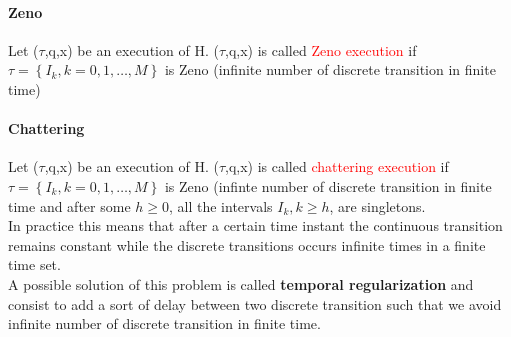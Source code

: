 \paragraph{Zeno} Let ($\tau$,q,x) be an execution of H. ($\tau$,q,x)  is called \textcolor{red}{Zeno execution} if $\tau = \left\{I_k, k=0,1,\dots,M\right\}$ is Zeno (infinite number of discrete transition in finite time)\\
\paragraph{Chattering} Let ($\tau$,q,x) be an execution of H. ($\tau$,q,x)  is called \textcolor{red}{chattering execution} if $\tau = \left\{I_k, k=0,1,\dots,M\right\}$ is Zeno (infinte number of discrete transition in finite time and after some $h \ge 0$, all the intervals $I_k,k \ge h$, are singletons.\\
In practice this means that after a certain time instant the continuous transition remains constant while the discrete transitions occurs infinite times in a finite time set.\\
A possible solution of this problem is called \textbf{temporal regularization} and consist to add a sort of delay between two discrete transition such that we avoid infinite number of discrete transition in finite time. 
